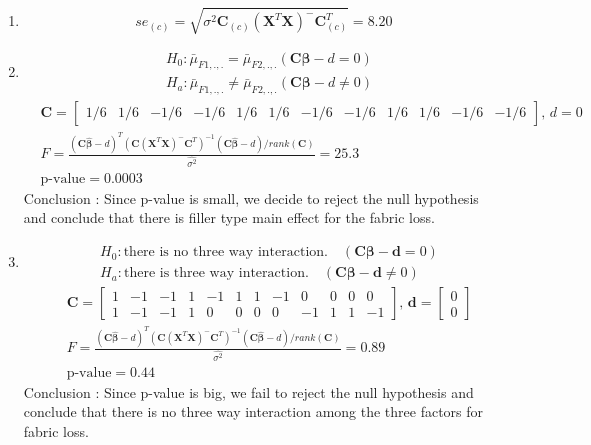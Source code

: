 \documentclass{article}
\begin{document}
\begin{enumerate}[leftmargin = 0 em, label = \arabic*., font = \bfseries]
\begin{enumerate}
		\item 
		\[se_{(c)} = \sqrt{\hat{\sigma^2} \bm C_{(c)} (\bm X^T \bm X)^- \bm C_{(c)}^T} = 8.20\]

		\item 
		\begin{align*}
		&H_0 : \bar{\mu}_{F1,.,.} = \bar{\mu}_{F2,.,.} (\bm C \bm \beta - d = 0)\\
		&H_a : \bar{\mu}_{F1,.,.} \neq \bar{\mu}_{F2,.,.} (\bm C \bm \beta -d \neq 0)
		\end{align*}
		\begin{align*}
		& \bm C = \begin{bmatrix}
			1/6&1/6&-1/6&-1/6&1/6&1/6&-1/6&-1/6&1/6&1/6&-1/6&-1/6
		\end{bmatrix},\, d = 0\\
		&  F = \frac{(\bm C \hat{\bm \beta} - d)^T (\bm C (\bm X^T \bm X)^-\bm C^T)^{-1} (\bm C \bm \hat{\bm\beta} - d)/rank(\bm C)}{\hat{\sigma^2}} = 25.3\\
		& \textrm{p-value} = 0.0003
		\end{align*}
		Conclusion : Since p-value is small, we decide to reject the null hypothesis and conclude that there is filler type main effect for the fabric loss.

		\item 
		\begin{align*}
		&H_0 : \textrm{there is no three way interaction.} \quad (\bm C \bm \beta - \bm d = 0)\\
		&H_a : \textrm{there is three way interaction.} \quad (\bm C \bm \beta -\bm d \neq 0)
		\end{align*}
		\begin{align*}
		& \bm C = \begin{bmatrix}
			1&-1&-1&1&-1&1&1&-1&0&0&0&0\\
			1&-1&-1&1&0&0&0&0&-1&1&1&-1
		\end{bmatrix},\, \bm d = \begin{bmatrix}
			0\\0
		\end{bmatrix}\\
		&  F = \frac{(\bm C \hat{\bm \beta} - d)^T (\bm C (\bm X^T \bm X)^-\bm C^T)^{-1} (\bm C \bm \hat{\bm\beta} - d)/rank(\bm C)}{\hat{\sigma^2}} = 0.89\\
		& \textrm{p-value} = 0.44
		\end{align*}
		Conclusion : Since p-value is big, we fail to reject the null hypothesis and conclude that there is no three way interaction among the three factors for fabric loss.


\end{enumerate}
\end{enumerate}
\end{document}
